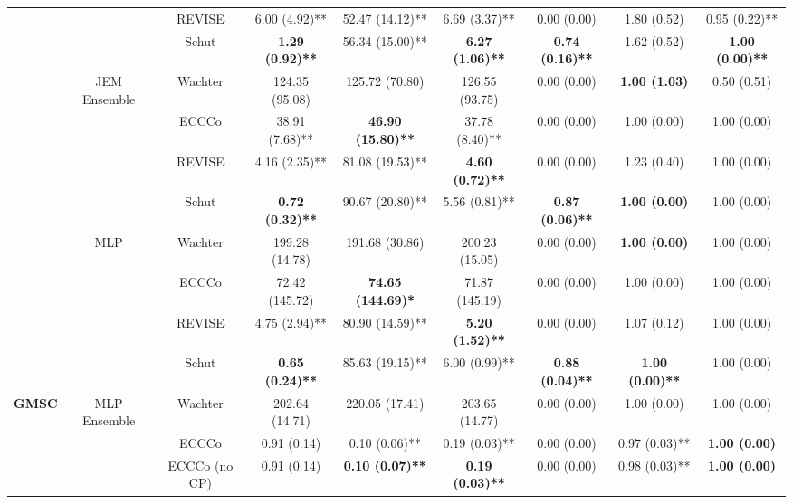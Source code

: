 \begin{table}
{\begin{tabular}[t]{>{}c|c|c|c|c|c|c|c|c}
 &  & REVISE & 6.00 (4.92)** & 52.47 (14.12)** & 6.69 (3.37)** & 0.00 (0.00) & 1.80 (0.52) & 0.95 (0.22)**\\

 &  & Schut & \textbf{1.29 (0.92)**} & 56.34 (15.00)** & \textbf{6.27 (1.06)**} & \textbf{0.74 (0.16)**} & 1.62 (0.52) & \textbf{1.00 (0.00)**}\\

 & \multirow{-4}{*}{\centering\arraybackslash JEM Ensemble} & Wachter & 124.35 (95.08) & 125.72 (70.80) & 126.55 (93.75) & 0.00 (0.00) & \textbf{1.00 (1.03)} & 0.50 (0.51)\\
\cline{2-9}
 &  & ECCCo & 38.91 (7.68)** & \textbf{46.90 (15.80)**} & 37.78 (8.40)** & 0.00 (0.00) & 1.00 (0.00) & 1.00 (0.00)\\

 &  & REVISE & 4.16 (2.35)** & 81.08 (19.53)** & \textbf{4.60 (0.72)**} & 0.00 (0.00) & 1.23 (0.40) & 1.00 (0.00)\\

 &  & Schut & \textbf{0.72 (0.32)**} & 90.67 (20.80)** & 5.56 (0.81)** & \textbf{0.87 (0.06)**} & \textbf{1.00 (0.00)} & 1.00 (0.00)\\

 & \multirow{-4}{*}{\centering\arraybackslash MLP} & Wachter & 199.28 (14.78) & 191.68 (30.86) & 200.23 (15.05) & 0.00 (0.00) & \textbf{1.00 (0.00)} & 1.00 (0.00)\\
\cline{2-9}
 &  & ECCCo & 72.42 (145.72) & \textbf{74.65 (144.69)*} & 71.87 (145.19) & 0.00 (0.00) & 1.00 (0.00) & 1.00 (0.00)\\

 &  & REVISE & 4.75 (2.94)** & 80.90 (14.59)** & \textbf{5.20 (1.52)**} & 0.00 (0.00) & 1.07 (0.12) & 1.00 (0.00)\\

 &  & Schut & \textbf{0.65 (0.24)**} & 85.63 (19.15)** & 6.00 (0.99)** & \textbf{0.88 (0.04)**} & \textbf{1.00 (0.00)**} & 1.00 (0.00)\\

\multirow{-16}{*}{\centering\arraybackslash \textbf{GMSC}} & \multirow{-4}{*}{\centering\arraybackslash MLP Ensemble} & Wachter & 202.64 (14.71) & 220.05 (17.41) & 203.65 (14.77) & 0.00 (0.00) & 1.00 (0.00) & 1.00 (0.00)\\
\cline{1-9}
 &  & ECCCo & 0.91 (0.14) & 0.10 (0.06)** & 0.19 (0.03)** & 0.00 (0.00) & 0.97 (0.03)** & \textbf{1.00 (0.00)}\\

 &  & ECCCo (no CP) & 0.91 (0.14) & \textbf{0.10 (0.07)**} & \textbf{0.19 (0.03)**} & 0.00 (0.00) & 0.98 (0.03)** & \textbf{1.00 (0.00)}\\


\end{tabular}}
\end{table}
